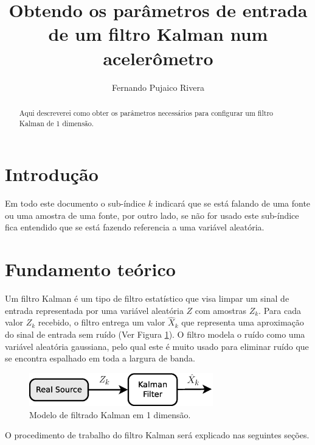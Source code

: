 \documentclass[a4paper,10pt]{article}
\title{Obtendo os parâmetros de entrada de um filtro Kalman num acelerômetro}
\author{Fernando Pujaico Rivera}
\begin{document}
\maketitle

\begin{abstract}
Aqui descreverei como obter os parâmetros necessários para configurar um filtro 
Kalman de 1 dimensão.
\end{abstract}

\section{Introdução}

Em todo este documento o sub-índice $k$ indicará que se está falando de uma fonte 
ou uma amostra de uma fonte, por outro lado, se não for usado este sub-índice fica
entendido que se está fazendo referencia a uma variável aleatória.

\section{Fundamento teórico}
Um filtro Kalman \cite{kalman,citeulike:347166} é um tipo de filtro estatístico que visa limpar um sinal de entrada 
representada por uma variável aleatória $Z$ com amostras $Z_k$. Para cada valor $Z_k$ 
recebido, o filtro entrega um valor $\hat{X}_k$ que representa uma aproximação do
sinal de entrada sem ruído (Ver Figura \ref{fig:model}).
O filtro modela o ruído como uma variável aleatória gaussiana, pelo qual 
este  é muito usado para eliminar ruído que se encontra espalhado em toda a largura de banda.

\begin{figure}[h!]
\center
 \includegraphics[width=8.0cm]{./images/KalmanModel.eps}
\caption{Modelo de filtrado Kalman em 1 dimensão.}
\label{fig:model}
\end{figure} 

O procedimento de trabalho do filtro Kalman será  explicado nas seguintes seções.
\end{document}
